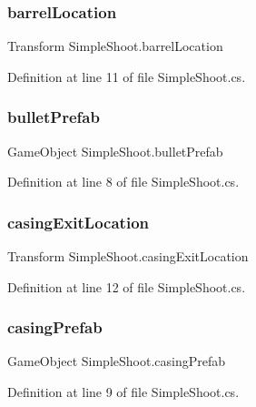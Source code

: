 \subsubsection{\texorpdfstring{barrelLocation}{barrelLocation}}
{\footnotesize\ttfamily Transform Simple\+Shoot.\+barrel\+Location}



Definition at line 11 of file Simple\+Shoot.\+cs.

\mbox{\label{class_simple_shoot_ac171d2d5c1240a628df27f5daad30650}} 
\subsubsection{\texorpdfstring{bulletPrefab}{bulletPrefab}}
{\footnotesize\ttfamily Game\+Object Simple\+Shoot.\+bullet\+Prefab}



Definition at line 8 of file Simple\+Shoot.\+cs.

\mbox{\label{class_simple_shoot_a93e53fc58d93328650990c266e37bf45}} 
\subsubsection{\texorpdfstring{casingExitLocation}{casingExitLocation}}
{\footnotesize\ttfamily Transform Simple\+Shoot.\+casing\+Exit\+Location}



Definition at line 12 of file Simple\+Shoot.\+cs.

\mbox{\label{class_simple_shoot_a71ec8176d7de8605e8b3179afdd84883}} 
\subsubsection{\texorpdfstring{casingPrefab}{casingPrefab}}
{\footnotesize\ttfamily Game\+Object Simple\+Shoot.\+casing\+Prefab}



Definition at line 9 of file Simple\+Shoot.\+cs.

